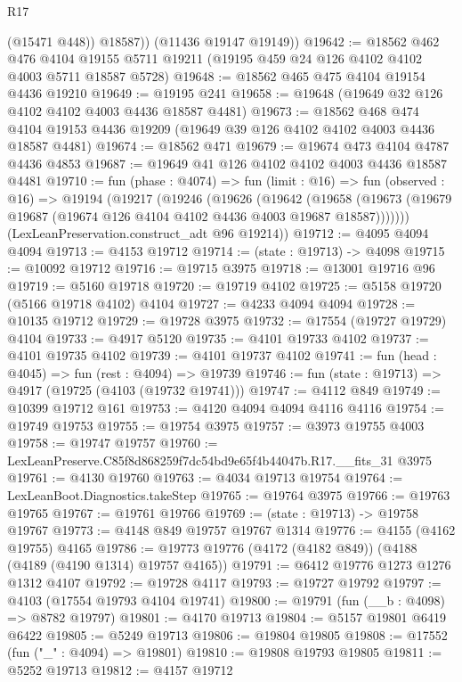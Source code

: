 \begin{lexlean}{R17}
\begin{coremodule}
            (@15471 @448))
          @18587))
      (@11436 @19147 @19149))
@19642 := @18562
    @462
    @476
    @4104
    @19155
    @5711
    @19211
    (@19195 @459 @24 @126 @4102 @4102 @4003 @5711 @18587 @5728)
@19648 := @18562 @465 @475 @4104 @19154 @4436 @19210
@19649 := @19195 @241
@19658 := @19648 (@19649 @32 @126 @4102 @4102 @4003 @4436 @18587 @4481)
@19673 := @18562
    @468
    @474
    @4104
    @19153
    @4436
    @19209
    (@19649 @39 @126 @4102 @4102 @4003 @4436 @18587 @4481)
@19674 := @18562 @471
@19679 := @19674 @473 @4104 @4787 @4436 @4853
@19687 := @19649 @41 @126 @4102 @4102 @4003 @4436 @18587 @4481
@19710 := fun (phase : @4074) =>
  fun (limit : @16) =>
  fun (observed : @16) =>
  @19194
    (@19217
      (@19246
        (@19626
          (@19642
            (@19658 (@19673 (@19679 @19687 (@19674 @126 @4104 @4102 @4436 @4003 @19687 @18587)))))))
      (LexLeanPreservation.construct_adt @96 @19214))
@19712 := @4095 @4094 @4094
@19713 := @4153 @19712
@19714 := (state : @19713) -> @4098
@19715 := @10092 @19712
@19716 := @19715 @3975
@19718 := @13001 @19716 @96
@19719 := @5160 @19718
@19720 := @19719 @4102
@19725 := @5158 @19720 (@5166 @19718 @4102) @4104
@19727 := @4233 @4094 @4094
@19728 := @10135 @19712
@19729 := @19728 @3975
@19732 := @17554 (@19727 @19729) @4104
@19733 := @4917 @5120
@19735 := @4101 @19733 @4102
@19737 := @4101 @19735 @4102
@19739 := @4101 @19737 @4102
@19741 := fun (head : @4045) => fun (rest : @4094) => @19739
@19746 := fun (state : @19713) => @4917 (@19725 (@4103 (@19732 @19741)))
@19747 := @4112 @849
@19749 := @10399 @19712 @161
@19753 := @4120 @4094 @4094 @4116 @4116
@19754 := @19749 @19753
@19755 := @19754 @3975
@19757 := @3973 @19755 @4003
@19758 := @19747 @19757
@19760 := LexLeanPreserve.C85f8d868259f7dc54bd9e65f4b44047b.R17.__fits_31 @3975
@19761 := @4130 @19760
@19763 := @4034 @19713 @19754
@19764 := LexLeanBoot.Diagnostics.takeStep
@19765 := @19764 @3975
@19766 := @19763 @19765
@19767 := @19761 @19766
@19769 := (state : @19713) -> @19758 @19767
@19773 := @4148 @849 @19757 @19767 @1314
@19776 := @4155 (@4162 @19755) @4165
@19786 := @19773 @19776 (@4172 (@4182 @849)) (@4188 (@4189 (@4190 @1314) @19757 @4165))
@19791 := @6412 @19776 @1273 @1276 @1312 @4107
@19792 := @19728 @4117
@19793 := @19727 @19792
@19797 := @4103 (@17554 @19793 @4104 @19741)
@19800 := @19791 (fun (__b : @4098) => @8782 @19797)
@19801 := @4170 @19713
@19804 := @5157 @19801 @6419 @6422
@19805 := @5249 @19713
@19806 := @19804 @19805
@19808 := @17552 (fun ("_" : @4094) => @19801)
@19810 := @19808 @19793 @19805
@19811 := @5252 @19713
@19812 := @4157 @19712

\end{coremodule}
\end{lexlean}
